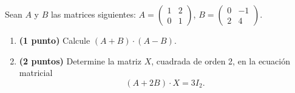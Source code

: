 
Sean $A$ y $B$ las matrices siguientes: $A=\begin{pmatrix}1&2\\0&1\end{pmatrix}$, $B=\begin{pmatrix}0&-1\\2&4\end{pmatrix}$.
\begin{enumerate}[label=\alph*)]
\item \textbf{(1 punto)} Calcule $(A+B)\cdot(A-B)$.
\item \textbf{(2 puntos)} Determine la matriz $X$, cuadrada de orden 2, en la ecuación matricial
\[
(A+2B)\cdot X=3I_2.
\]
\end{enumerate}

